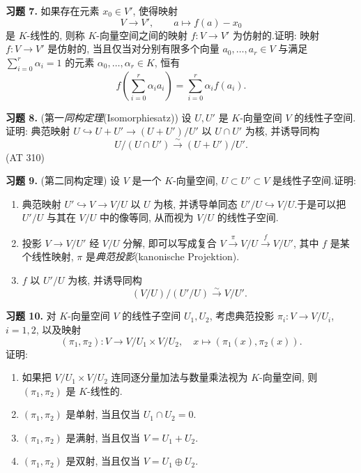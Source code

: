 \noindent\textbf{习题 7.} 如果存在元素 $x_0 \in V'$, 使得映射
\[
V \longrightarrow V', \qquad a \longmapsto f(a) - x_0
\]
是 $K$-线性的, 则称 $K$-向量空间之间的映射 $f \colon V \longrightarrow V'$ 为仿射的.证明: 映射 $f \colon V \longrightarrow V'$ 是仿射的, 当且仅当对分别有限多个向量 $a_0, \ldots, a_r \in V$ 与满足 $\sum_{i = 0}^{r} \alpha_i = 1$ 的元素 $\alpha_0, \ldots, \alpha_r \in K$, 恒有
\[
f\left(\sum_{i = 0}^{r} \alpha_i a_i\right) = \sum_{i = 0}^{r} \alpha_i f(a_i)\text{.}
\]

\noindent\textbf{习题 8.} (第一\emph{同构定理}(\textup{Isomorphiesatz})) 设 $U, U'$ 是 $K$-向量空间 $V$ 的线性子空间.证明: 典范映射 $U \hookrightarrow U + U' \longrightarrow (U + U')/U'$ 以 $U \cap U'$ 为核, 并诱导同构
\[
U/(U \cap U') \overset{\sim}{\longrightarrow} (U + U')/U'\text{.}
\]
(AT 310)

\noindent\textbf{习题 9.} (第二同构定理) 设 $V$ 是一个 $K$-向量空间, $U \subset U' \subset V$ 是线性子空间.证明:
\begin{enumerate}
\item[(i)] 典范映射 $U' \hookrightarrow V \longrightarrow V/U$ 以 $U$ 为核, 并诱导单同态 $U'/U \hookrightarrow V/U$.于是可以把 $U'/U$ 与其在 $V/U$ 中的像等同, 从而视为 $V/U$ 的线性子空间.
\item[(ii)] 投影 $V \longrightarrow V/U'$ 经 $V/U$ 分解, 即可以写成复合 $V \xrightarrow{\pi} V/U \xrightarrow{f} V/U'$, 其中 $f$ 是某个线性映射, $\pi$ 是\emph{典范投影}(\textup{kanonische Projektion}).
\item[(iii)] $f$ 以 $U'/U$ 为核, 并诱导同构
\[
(V/U)/(U'/U) \overset{\sim}{\longrightarrow} V/U'\text{.}
\]
\end{enumerate}

\noindent\textbf{习题 10.} 对 $K$-向量空间 $V$ 的线性子空间 $U_1, U_2$, 考虑典范投影 $\pi_i \colon V \longrightarrow V/U_i$, $i = 1, 2$, 以及映射
\[
(\pi_1, \pi_2) \colon V \longrightarrow V/U_1 \times V/U_2, \quad x \longmapsto (\pi_1(x), \pi_2(x))\text{.}
\]
证明:
\begin{enumerate}
\item[(i)] 如果把 $V/U_1 \times V/U_2$ 连同逐分量加法与数量乘法视为 $K$-向量空间, 则 $(\pi_1, \pi_2)$ 是 $K$-线性的.
\item[(ii)] $(\pi_1, \pi_2)$ 是单射, 当且仅当 $U_1 \cap U_2 = 0$.
\item[(iii)] $(\pi_1, \pi_2)$ 是满射, 当且仅当 $V = U_1 + U_2$.
\item[(iv)] $(\pi_1, \pi_2)$ 是双射, 当且仅当 $V = U_1 \oplus U_2$.
\end{enumerate}

